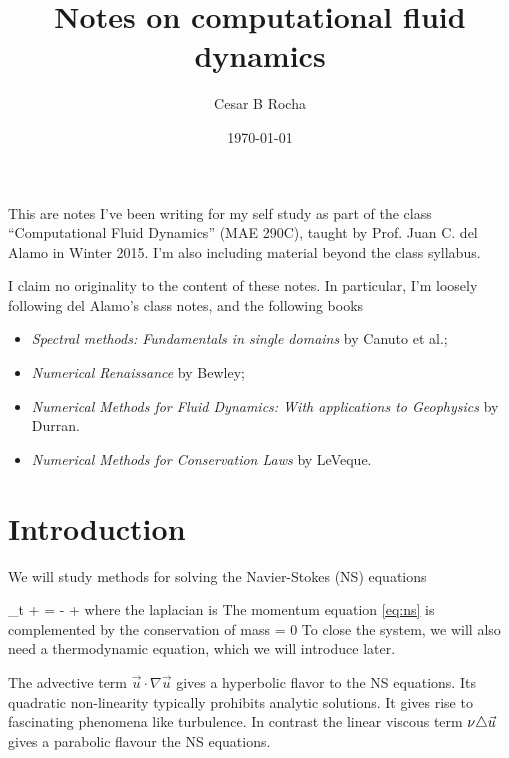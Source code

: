 \documentclass[11pt]{article}
\title{Notes on computational fluid dynamics}
\author{Cesar B Rocha}
\date{\today}
\begin{document}


\maketitle

This are notes I've been writing for my self study as part of the class ``Computational Fluid Dynamics'' (MAE 290C), taught by Prof. Juan C. del Alamo in Winter 2015. I'm also including material beyond the class syllabus.


I claim no originality to the content of these notes.  In particular, I'm loosely following del Alamo's class notes, and the following books

\begin{itemize}

    \item \textit{Spectral methods: Fundamentals in single domains} by Canuto et al.;

    \item \textit{Numerical Renaissance} by Bewley;

    \item \textit{Numerical Methods for Fluid Dynamics: With applications 
        to Geophysics} by Durran.

    \item \textit{Numerical Methods for Conservation Laws} by LeVeque.

\end{itemize}

\section{Introduction}
We will study methods for solving  the Navier-Stokes (NS) equations

\beq
\label{eq:ns}
\p_t  + \cdot \nabla {} = - + \nu \lap {}\com
\eeq
where the laplacian is
\beq
\label{eq:lap_defn}
\lap {} \nabla \cdot \nabla
\eeq
The momentum equation \eqref{eq:ns} is complemented by the conservation of mass
\beq
\label{eq:cons_mass}
\nabla\cdot{} = 0\per
\eeq
To close the system, we will also need a thermodynamic equation, which we will introduce later.

The advective term $\vec{u}\cdot\nabla\vec{u}$ gives a hyperbolic flavor to the NS equations. Its quadratic non-linearity typically prohibits analytic solutions. It gives rise to fascinating phenomena like turbulence. In contrast the linear viscous term $\nu\triangle\vec{u}$ gives a parabolic flavour the NS equations.
\end{document}
